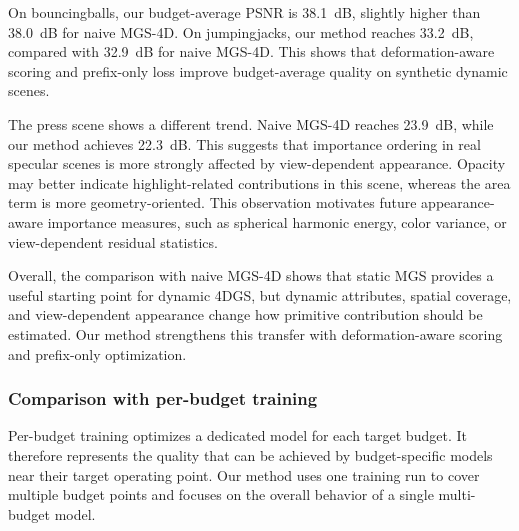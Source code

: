 \documentclass[pdflatex,sn-mathphys]{sn-jnl}
\begin{document}
On bouncingballs, our budget-average PSNR is 38.1~dB, slightly higher than 38.0~dB for naive MGS-4D. On jumpingjacks, our method reaches 33.2~dB, compared with 32.9~dB for naive MGS-4D. This shows that deformation-aware scoring and prefix-only loss improve budget-average quality on synthetic dynamic scenes.

The press scene shows a different trend. Naive MGS-4D reaches 23.9~dB, while our method achieves 22.3~dB. This suggests that importance ordering in real specular scenes is more strongly affected by view-dependent appearance. Opacity may better indicate highlight-related contributions in this scene, whereas the area term is more geometry-oriented. This observation motivates future appearance-aware importance measures, such as spherical harmonic energy, color variance, or view-dependent residual statistics.

Overall, the comparison with naive MGS-4D shows that static MGS provides a useful starting point for dynamic 4DGS, but dynamic attributes, spatial coverage, and view-dependent appearance change how primitive contribution should be estimated. Our method strengthens this transfer with deformation-aware scoring and prefix-only optimization.

\subsubsection{Comparison with per-budget training}

Per-budget training optimizes a dedicated model for each target budget. It therefore represents the quality that can be achieved by budget-specific models near their target operating point. Our method uses one training run to cover multiple budget points and focuses on the overall behavior of a single multi-budget model.
\end{document}
